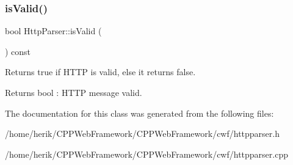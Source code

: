 \subsubsection{\texorpdfstring{is\+Valid()}{isValid()}}
{\footnotesize\ttfamily bool Http\+Parser\+::is\+Valid (\begin{DoxyParamCaption}{ }\end{DoxyParamCaption}) const\hspace{0.3cm}{\ttfamily [inline]}}



Returns true if H\+T\+TP is valid, else it returns false. 

\begin{DoxyReturn}{Returns}
bool \+: H\+T\+TP message valid. 
\end{DoxyReturn}


The documentation for this class was generated from the following files\+:\begin{DoxyCompactItemize}
\item 
/home/herik/\+C\+P\+P\+Web\+Framework/\+C\+P\+P\+Web\+Framework/cwf/httpparser.\+h\item 
/home/herik/\+C\+P\+P\+Web\+Framework/\+C\+P\+P\+Web\+Framework/cwf/httpparser.\+cpp\end{DoxyCompactItemize}
